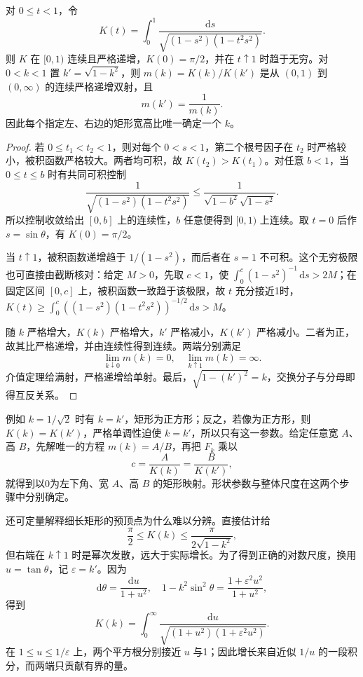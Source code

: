 \begin{proposition}[矩形宽高比的参数化]\label{b3:prop:07-elliptic-aspect}
对 \(0\le t<1\)，令
\[
 K(t)=\int_0^1\frac{\mathrm{d}s}
 {\sqrt{(1-s^2)(1-t^2s^2)}}.
\]
则 \(K\) 在 \([0,1)\) 连续且严格递增，\(K(0)=\pi/2\)，并在 \(t\uparrow1\) 时趋于无穷。对 \(0<k<1\) 置 \(k'=\sqrt{1-k^2}\)，则
\(m(k)=K(k)/K(k')\)
是从 \((0,1)\) 到 \((0,\infty)\) 的连续严格递增双射，且
\[
 m(k')=\frac1{m(k)}.
\]
因此每个指定左、右边的矩形宽高比唯一确定一个 \(k\)。
\end{proposition}
\begin{proof}
若 \(0\le t_1<t_2<1\)，则对每个 \(0<s<1\)，第二个根号因子在 \(t_2\) 时严格较小，被积函数严格较大。两者均可积，故 \(K(t_2)>K(t_1)\)。对任意 \(b<1\)，当 \(0\le t\le b\) 时有共同可积控制
\[
 \frac1{\sqrt{(1-s^2)(1-t^2s^2)}}
 \le\frac1{\sqrt{1-b^2}\sqrt{1-s^2}}.
\]
所以控制收敛给出 \([0,b]\) 上的连续性，\(b\) 任意便得到 \([0,1)\) 上连续。取 \(t=0\) 后作 \(s=\sin\theta\)，有 \(K(0)=\pi/2\)。

当 \(t\uparrow1\)，被积函数递增趋于 \(1/(1-s^2)\)，而后者在 \(s=1\) 不可积。这个无穷极限也可直接由截断核对：给定 \(M>0\)，先取 \(c<1\)，使
\(\int_0^c(1-s^2)^{-1}\,\mathrm{d}s>2M\)；在固定区间 \([0,c]\) 上，被积函数一致趋于该极限，故 \(t\) 充分接近1时，\(K(t)\ge\int_0^c((1-s^2)(1-t^2s^2))^{-1/2}\,\mathrm{d}s>M\)。

随 \(k\) 严格增大，\(K(k)\) 严格增大，\(k'\) 严格减小，\(K(k')\) 严格减小。二者为正，故其比严格递增，并由连续性得到连续。两端分别满足
\[
 \lim_{k\downarrow0}m(k)=0,\quad
 \lim_{k\uparrow1}m(k)=\infty.
\]
介值定理给满射，严格递增给单射。最后，\(\sqrt{1-(k')^2}=k\)，交换分子与分母即得互反关系。
\end{proof}

例如 \(k=1/\sqrt2\) 时有 \(k=k'\)，矩形为正方形；反之，若像为正方形，则 \(K(k)=K(k')\)，严格单调性迫使 \(k=k'\)，所以只有这一参数。给定任意宽 \(A\)、高 \(B\)，先解唯一的方程 \(m(k)=A/B\)，再把 \(F_k\) 乘以
\[
 c=\frac{A}{K(k)}=\frac{B}{K(k')},
\]
就得到以0为左下角、宽 \(A\)、高 \(B\) 的矩形映射。形状参数与整体尺度在这两个步骤中分别确定。

\ProseParagraphBreak

还可定量解释细长矩形的预顶点为什么难以分辨。直接估计给
\[
 \frac\pi2\le K(k)\le\frac\pi{2\sqrt{1-k^2}},
\]
但右端在 \(k\uparrow1\) 时是幂次发散，远大于实际增长。为了得到正确的对数尺度，换用 \(u=\tan\theta\)，记 \(\varepsilon=k'\)。因为
\[
 \mathrm{d}\theta=\frac{\mathrm{d}u}{1+u^2},\quad
 1-k^2\sin^2\theta=\frac{1+\varepsilon^2u^2}{1+u^2},
\]
得到
\[
 K(k)=\int_0^\infty
 \frac{\mathrm{d}u}{\sqrt{(1+u^2)(1+\varepsilon^2u^2)}}.
\]
在 \(1\le u\le1/\varepsilon\) 上，两个平方根分别接近 \(u\) 与1；因此增长来自近似 \(1/u\) 的一段积分，而两端只贡献有界的量。

